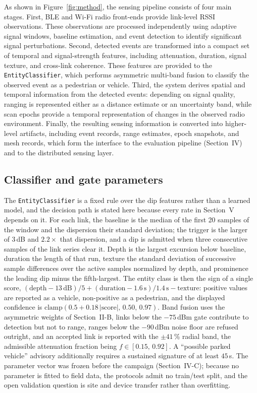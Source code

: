 \documentclass[journal,10pt]{IEEEtran}
\begin{document}
As shown in Figure~\ref{fig:method}, the sensing pipeline consists of four
main stages. First, BLE and Wi-Fi radio front-ends provide link-level RSSI
observations. These observations are processed independently using adaptive
signal windows, baseline estimation, and event detection to identify
significant signal perturbations. Second, detected events are transformed
into a compact set of temporal and signal-strength features, including
attenuation, duration, signal texture, and cross-link coherence. These
features are provided to the \texttt{EntityClassifier}, which performs
asymmetric multi-band fusion to classify the observed event as a pedestrian
or vehicle. Third, the system derives spatial and temporal information from
the detected events: depending on signal quality, ranging is represented
either as a distance estimate or an uncertainty band, while scan epochs
provide a temporal representation of changes in the observed radio
environment. Finally, the resulting sensing information is converted into
higher-level artifacts, including event records, range estimates, epoch
snapshots, and mesh records, which form the interface to the evaluation
pipeline (Section~IV) and to the distributed sensing layer.

\subsection{Classifier and gate parameters}
The \texttt{EntityClassifier} is a fixed rule over the dip features rather than a
learned model, and the decision path is stated here because every rate in
Section~V depends on it. For each link, the baseline is the median of the first
20 samples of the window and the dispersion their standard deviation; the trigger
is the larger of $3$\,dB and $2.2\times$ that dispersion, and a dip is admitted
when three consecutive samples of the link series clear it. Depth is the largest
excursion below baseline, duration the length of that run, texture the standard
deviation of successive sample differences over the active samples normalized by
depth, and prominence the leading dip minus the fifth-largest. The entity class
is then the sign of a single score,
$(\text{depth}-13\,\mathrm{dB})/5+(\text{duration}-1.6\,\mathrm{s})/1.4\,\mathrm{s}-\text{texture}$:
positive values are reported as a vehicle, non-positive as a pedestrian, and the
displayed confidence is $\mathrm{clamp}(0.5+0.18\,|\text{score}|,\,0.50,\,0.97)$.
Band fusion uses the asymmetric weights of Section~II-B, links below the
$-75$\,dBm gate contribute to detection but not to range, ranges below the
$-90$\,dBm noise floor are refused outright, and an accepted link is reported
with the $\pm41$\,\% radial band, the admissible attenuation fraction being
$f \in [0.15,\,0.92]$. A ``possible parked vehicle'' advisory
additionally requires a sustained signature of at least $45$\,s. The parameter
vector was frozen before the campaign (Section~IV-C); because no parameter is
fitted to field data, the protocols admit no train/test split, and the open
validation question is site and device transfer rather than overfitting.
\end{document}
